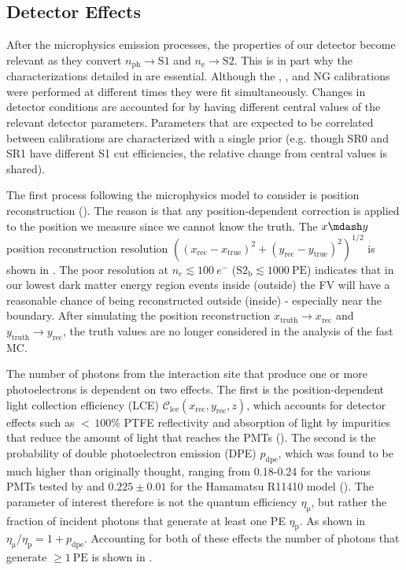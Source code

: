 \subsection{Detector Effects}
\label{subsec:er_nr_calibrations_parameter_determ_det_phys}
After the microphysics emission processes, the properties of our detector become relevant as they convert
$n_{\mathrm{ph}} \rightarrow \mathrm{S1}$ and $n_{\mathrm{e}} \rightarrow \mathrm{S2}$.  This is in part why the
characterizations detailed in  are essential.  Although the , , and NG calibrations
were performed at different times they were fit simultaneously.  Changes in detector conditions
are accounted for by having different central values of the relevant detector parameters.  Parameters that are expected to be correlated
between calibrations are characterized with a single prior (e.g. though SR0 and SR1 have different S1 cut efficiencies, the relative change
from central values is shared).

The first process following the microphysics model to consider is position reconstruction
().  The reason is that
any position-dependent correction is applied to the position we measure since we cannot know the truth.  The $x \mdash y$ position
reconstruction resolution $((x_{\mathrm{rec}} - x_{\mathrm{true}})^2 + (y_{\mathrm{rec}} - y_{\mathrm{true}})^2)^{1/2}$ is shown in
.  The poor resolution at
$n_e \lesssim 100\ e^-$ ($\mathrm{S2_b} \lesssim 1000\ \mathrm{PE}$) indicates that in our lowest dark matter energy region events inside
(outside) the FV will have a reasonable chance of being reconstructed outside (inside) - especially near the boundary.  After simulating
the position reconstruction $x_{\mathrm{truth}} \rightarrow x_{\mathrm{rec}}$ and
$y_{\mathrm{truth}} \rightarrow y_{\mathrm{rec}}$, the truth values are no longer considered in the analysis of the fast MC.

The number of photons from the interaction site that produce one or more photoelectrons is dependent on two effects.  The first is
the position-dependent light collection efficiency (LCE) $\mathcal{C}_{\mathrm{lce}}(x_{\mathrm{rec}}, y_{\mathrm{rec}}, z)$, which
accounts for detector effects such as ${<}\, 100\%$ PTFE reflectivity and
absorption of light by impurities that reduce the amount of light that reaches the PMTs
().  The second is the probability of double photoelectron emission (DPE) $p_{\mathrm{dpe}}$, which was found
to be much higher than originally thought, ranging from 0.18-0.24 for the various PMTs tested by  and $0.225 \pm 0.01$
for the Hamamatsu R11410 model ().  The parameter of interest therefore is not the quantum efficiency
$\eta_{\mathrm{\mu}}$, but rather the
fraction of incident photons that generate at least one PE $\eta_{\mathrm{p}}$.  As shown in 
$\eta_{\mathrm{\mu}} / \eta_{\mathrm{p}} = 1 + p_{\mathrm{dpe}}$.  Accounting for both of these effects the number of photons that
generate $\geq 1\ \mathrm{PE}$ is shown in .

